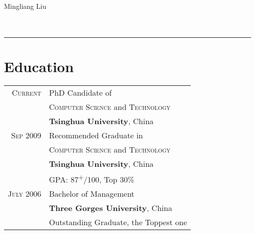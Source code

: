 \documentclass[10pt]{article}
\begin{document}
	\par{\centering
		{\sffamily\Huge Mingliang Liu
	}\\~\\~\\
    {\color{white} \hrule}

    \begin{minipage}[t]{0.5\textwidth}
        \vspace{0pt}	%
        \section{Education}
            \begin{tabular}{rl}
                \textsc{Current} & PhD Candidate of\\
                 & \textsc{Computer Science} and \textsc{Technology}\\
                 & \textbf{Tsinghua University}, China
                 \vspace{0.2cm}\\
                \textsc{Sep} 2009 & Recommended Graduate in\\
                 & \textsc{Computer Science} and \textsc{Technology}\\
                 & \textbf{Tsinghua University}, China\\
                 & \textsc{GPA}: 87\textsuperscript{+}/100, Top 30\%
                 \vspace{0.2cm}\\
                \textsc{July} 2006 & Bachelor of Management\\
                & \textbf{Three Gorges University}, China\\
                & Outstanding Graduate, the Toppest one\\
            \end{tabular}\\[5pt]


\end{minipage}}
\end{document}
